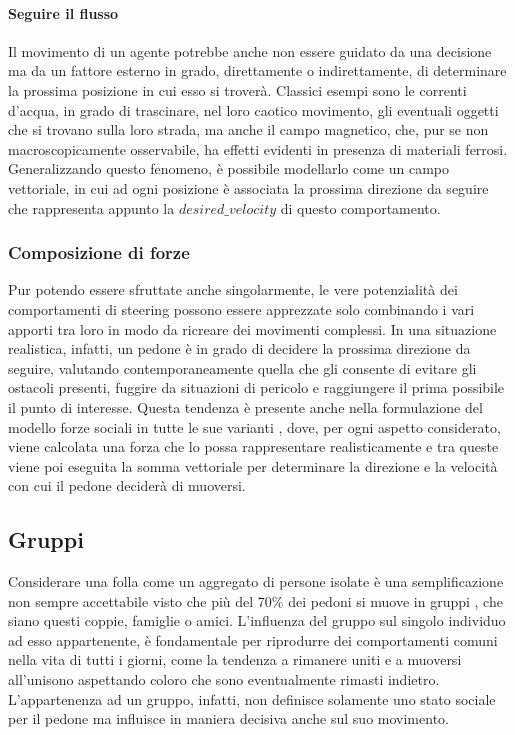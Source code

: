 \paragraph{Seguire il flusso}
Il movimento di un agente potrebbe anche non essere guidato da una decisione ma da un fattore esterno in grado, direttamente o indirettamente, di determinare la prossima posizione in cui esso si troverà. Classici esempi sono le correnti d'acqua, in grado di trascinare, nel loro caotico movimento, gli eventuali oggetti che si trovano sulla loro strada, ma anche il campo magnetico, che, pur se non macroscopicamente osservabile, ha effetti evidenti in presenza di materiali ferrosi. \newline
Generalizzando questo fenomeno, è possibile modellarlo come un campo vettoriale, in cui ad ogni posizione è associata la prossima direzione da seguire che rappresenta appunto la $desired\_velocity$ di questo comportamento.

\subsubsection{Composizione di forze}
Pur potendo essere sfruttate anche singolarmente, le vere potenzialità dei comportamenti di steering possono essere apprezzate solo combinando i vari apporti tra loro in modo da ricreare dei movimenti complessi. In una situazione realistica, infatti, un pedone è in grado di decidere la prossima direzione da seguire, valutando contemporaneamente quella che gli consente di evitare gli ostacoli presenti, fuggire da situazioni di pericolo e raggiungere il prima possibile il punto di interesse. \newline
Questa tendenza è presente anche nella formulazione del modello forze sociali in tutte le sue varianti \cite{Chen2017}, dove, per ogni aspetto considerato, viene calcolata una forza che lo possa rappresentare realisticamente e tra queste viene poi eseguita la somma vettoriale per determinare la direzione e la velocità con cui il pedone deciderà di muoversi.

\subsection{Gruppi}
Considerare una folla come un aggregato di persone isolate è una semplificazione non sempre accettabile visto che più del 70\% dei pedoni si muove in gruppi \cite{Moussad2010}, che siano questi coppie, famiglie o amici. \newline
L'influenza del gruppo sul singolo individuo ad esso appartenente, è fondamentale per riprodurre dei comportamenti comuni nella vita di tutti i giorni, come la tendenza a rimanere uniti e a muoversi all'unisono aspettando coloro che sono eventualmente rimasti indietro. L'appartenenza ad un gruppo, infatti, non definisce solamente uno stato sociale per il pedone ma influisce in maniera decisiva anche sul suo movimento.

